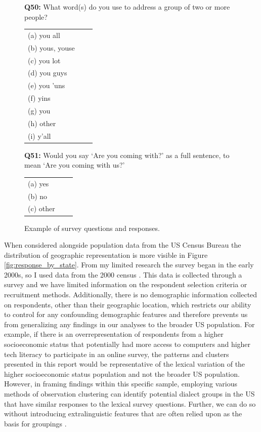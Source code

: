 \documentclass[10pt,letterpaper]{article}
\begin{document}
\begin{figure}[ht]
\centering
\begin{tcolorbox}[width=0.95\textwidth]
\textbf{Q50:} What word(s) do you use to address a group of two or more people?

\begin{tabular}{lll}
(a) you all \\
(b) yous, youse \\
(c) you lot \\
(d) you guys \\
(e) you 'uns  \\
(f) yins \\
(g) you  \\
(h) other \\
(i) y'all
\end{tabular}

\vspace{1em}

\textbf{Q51:} Would you say `Are you coming with?' as a full sentence,
to mean `Are you coming with us?'

\begin{tabular}{lll}
(a) yes  \\
(b) no \\
(c) other 
\end{tabular}

\end{tcolorbox}
\caption{Example of survey questions and responses.}
\label{fig:survey_questions}
\end{figure}

When considered alongside population data from the US Census Bureau \cite{bureau_resident_2000} the distribution of geographic representation is more visible in Figure \ref{fig:response_by_state}. From my limited research the survey began in the early 2000s, so I used data from the 2000 census \cite{bureau_resident_2000}. This data is collected through a survey and we have limited information on the respondent selection criteria or recruitment methods. Additionally, there is no  demographic information collected on respondents, other than their geographic location, which restricts our ability to control for any confounding demographic features and therefore prevents us from generalizing any findings in our analyses to the broader US population. For example, if  there is an overrepresentation of respondents from a higher socioeconomic status that potentially had more access to computers and higher tech literacy to participate in an online survey, the patterns and clusters presented in this report would be representative of the lexical variation of the higher socioeconomic status population and not the broader US population. However, in framing findings within this specific sample, employing various methods of observation clustering can identify potential dialect groups in the US that have similar responses to the lexical survey questions. Further, we can do so without introducing extralinguistic features that are often relied upon as the basis for groupings \cite{nerbonne_introducing_2023}.
\end{document}
